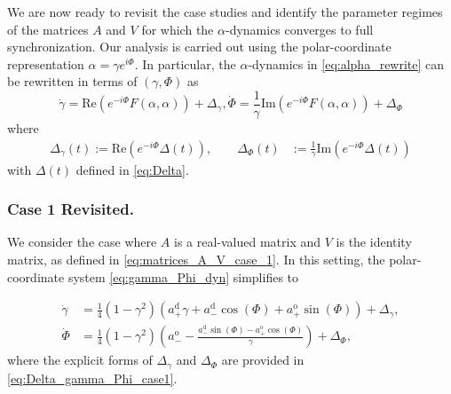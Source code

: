 \documentclass[10pt]{article}
\theoremstyle{definition}
\theoremstyle{definition}
\numberwithin{equation}{section}
\newcommand{\im}[1]{\mathrm{Im} \left(#1\right)}
\newcommand{\re}[1]{\mathrm{Re}\left(#1\right)}
\newcommand{\aDPlus}{a_+^{\text{d}}}
\newcommand{\aDMinus}{a_-^{\text{d}}}
\newcommand{\aOPlus}{a_+^{\text{o}}}
\newcommand{\aOMinus}{a_-^{\text{o}}}
\newcommand{\Dgamma}{\Dot{\gamma}}
\newcommand{\DPhi}{\Dot{\Phi}}
\newcommand{\DeltaGamma}{\Delta_{\gamma}}
\newcommand{\DeltaPhi}{\Delta_{\Phi}}
\begin{document}
We are now ready to revisit the case studies and identify the parameter regimes of the matrices $A$ and $V$ for which the $\alpha$-dynamics converges to full synchronization.
Our analysis is carried out using the polar-coordinate representation $\alpha = \gamma e^{i\Phi}$.
In particular, the $\alpha$-dynamics in \eqref{eq:alpha_rewrite} can be rewritten in terms of $(\gamma,\Phi)$ as
\begin{subequations}\label{eq:gamma_Phi_dyn}
\begin{equation}\label{eq:gamma_dyn}
\Dgamma = \re{e^{-i\Phi} F(\alpha, \alpha)} + \Delta_{\gamma},
\end{equation}
\begin{equation}\label{eq:Phi_dyn}
\DPhi = \frac{1}{\gamma} \im{e^{-i\Phi} F(\alpha, \alpha)} + \Delta_{\Phi}
\end{equation}
\end{subequations}
where
\begin{equation}\label{eq:Delta_gamma_Phi}
\begin{aligned}
\Delta_{\gamma}(t) := \re{e^{-i\Phi} \Delta(t)}, \qquad \Delta_{\Phi}(t) &:= \frac{1}{\gamma}\im{e^{-i\Phi} \Delta(t)}
\end{aligned}
\end{equation}
with $\Delta(t)$ defined in \eqref{eq:Delta}.

\subsubsection*{Case 1 Revisited.}
We consider the case where $A$ is a real-valued matrix and $V$ is the identity matrix, as defined in \eqref{eq:matrices_A_V_case_1}.
In this setting, the polar-coordinate system \eqref{eq:gamma_Phi_dyn} simplifies to

\begin{equation}\label{eq:alpha_pc_dyn_case1}
    \begin{aligned}
    \dot{\gamma} &= \frac{1}{4} \left(1 - \gamma^2 \right) \left( \aDPlus \gamma + \aDMinus \cos (\Phi) + \aOPlus \sin (\Phi) \right) + \Delta_\gamma,\\[4pt]
    \dot{\Phi} &= \frac{1}{4} \left(1 - \gamma^2 \right) \left( \aOMinus - \frac{\aDMinus \sin (\Phi) - \aOPlus \cos (\Phi)}{\gamma} \right) + \Delta_{\Phi},
    \end{aligned}
\end{equation}
where the explicit forms of $\DeltaGamma$ and $\DeltaPhi$ are provided in \eqref{eq:Delta_gamma_Phi_case1}.
\end{document}
